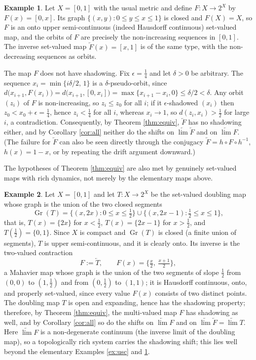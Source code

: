 \documentclass[12pt]{amsart}
\theoremstyle{definition}
\newtheorem{example}{Example}%
\begin{document}
\begin{example}\label{ex:nodrift}
	Let $X=[0,1]$ with the usual metric and define $F:X\rightarrow 2^X$ by $F(x)=[0,x]$. Its graph $\{(x,y):0\leq y\leq x\leq1\}$ is closed and $F(X)=X$, so $F$ is an onto upper semi-continuous (indeed Hausdorff continuous) set-valued map, and the orbits of $F$ are precisely the non-increasing sequences in $[0,1]$. The inverse set-valued map $\underleftarrow{F}(x)=[x,1]$ is of the same type, with the non-decreasing sequences as orbits.
	
	The map $F$ does not have shadowing. Fix $\epsilon=\tfrac14$ and let $\delta>0$ be arbitrary. The sequence $x_i=\min\{i\delta/2,\,1\}$ is a $\delta$-pseudo-orbit, since $d\big(x_{i+1},F(x_i)\big)=d\big(x_{i+1},[0,x_i]\big)=\max\{x_{i+1}-x_i,0\}\leq\delta/2<\delta$. Any orbit $(z_i)$ of $F$ is non-increasing, so $z_i\leq z_0$ for all $i$; if it $\epsilon$-shadowed $(x_i)$ then $z_0<x_0+\epsilon=\tfrac14$, hence $z_i<\tfrac14$ for all $i$, whereas $x_i\to1$, so $d(z_i,x_i)>\tfrac12$ for large $i$, a contradiction. Consequently, by Theorem \ref{thm:equiv}, $\underleftarrow{F}$ has no shadowing either, and by Corollary \ref{cor:all} neither do the shifts on $\underleftarrow{\lim} \underleftarrow{F}$ and on $\underleftarrow{\lim} F$. (The failure for $\underleftarrow{F}$ can also be seen directly through the conjugacy $\underleftarrow{F}=h\circ F\circ h^{-1}$, $h(x)=1-x$, or by repeating the drift argument downward.)
\end{example}

The hypotheses of Theorem \ref{thm:equiv} are also met by genuinely set-valued maps with rich dynamics, not merely by the elementary maps above.

\begin{example}\label{ex:doubling}
	Let $X=[0,1]$ and let $T:X\rightarrow 2^X$ be the set-valued doubling map whose graph is the union of the two closed segments
	$$\operatorname{Gr}(T)=\{(x,2x):0\leq x\leq\tfrac12\}\cup\{(x,2x-1):\tfrac12\leq x\leq1\},$$
	that is, $T(x)=\{2x\}$ for $x<\tfrac12$, $T(x)=\{2x-1\}$ for $x>\tfrac12$, and $T(\tfrac12)=\{0,1\}$. Since $X$ is compact and $\operatorname{Gr}(T)$ is closed (a finite union of segments), $T$ is upper semi-continuous, and it is clearly onto. Its inverse is the two-valued contraction
	$$F:=\underleftarrow{T},\qquad F(x)=\Big\{\tfrac{x}{2},\ \tfrac{x+1}{2}\Big\},$$
	a Mahavier map whose graph is the union of the two segments of slope $\tfrac12$ from $(0,0)$ to $(1,\tfrac12)$ and from $(0,\tfrac12)$ to $(1,1)$; it is Hausdorff continuous, onto, and properly set-valued, since every value $F(x)$ consists of two distinct points. The doubling map $T$ is open and expanding, hence has the shadowing property; therefore, by Theorem \ref{thm:equiv}, the multi-valued map $F$ has shadowing as well, and by Corollary \ref{cor:all} so do the shifts on $\underleftarrow{\lim} F$ and on $\underleftarrow{\lim} \underleftarrow{F}=\underleftarrow{\lim} T$. Here $\underleftarrow{\lim} F$ is a non-degenerate continuum (the inverse limit of the doubling map), so a topologically rich system carries the shadowing shift; this lies well beyond the elementary Examples \ref{ex:usc} and \ref{ex:nodrift}.
\end{example}
\end{document}
